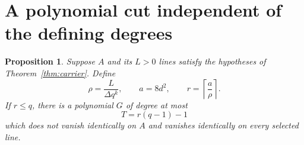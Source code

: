 \documentclass[11pt]{article}
\newtheorem{proposition}[theorem]{Proposition}
\theoremstyle{remark}
\begin{document}
\section{A polynomial cut independent of the defining degrees}

\begin{proposition}\label{prop:cut}
Suppose $A$ and its $L>0$ lines satisfy the hypotheses of
Theorem~\ref{thm:carrier}. Define
\[
 \rho=\frac{L}{\Delta q^k},\qquad
 a=8d^2,\qquad r=\left\lceil\frac a\rho\right\rceil.
\]
If $r\le q$, there is a polynomial $G$ of degree at most
\begin{equation}\label{eq:T}
 T=r(q-1)-1
\end{equation}
which does not vanish identically on $A$ and vanishes identically
on every selected line.
\end{proposition}
\end{document}
